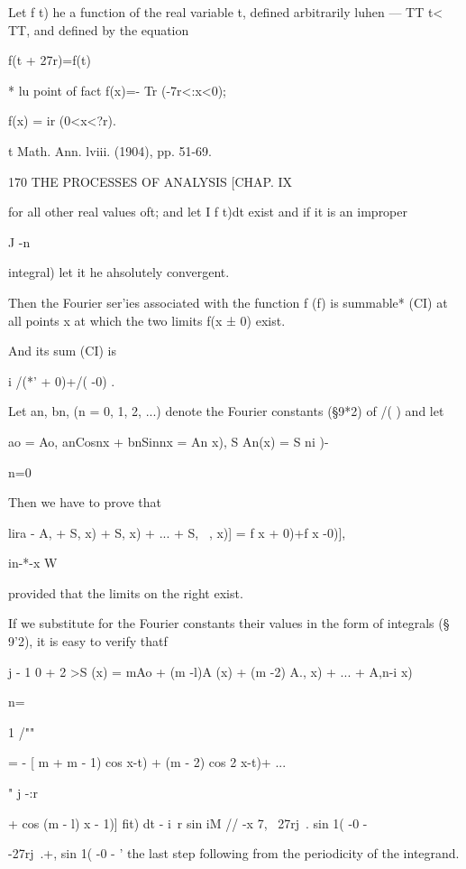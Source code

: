 Let f t) he a function of the real variable t, defined arbitrarily luhen 
— TT  t< TT, and defined by the equation 

f(t + 27r)=f(t) 

* lu point of fact f(x)=- Tr (-7r<:x<0); 

f(x) =  ir (0<x<?r). 

t Math. Ann. lviii. (1904), pp. 51-69. 



170 THE PROCESSES OF ANALYSIS [CHAP. IX 



for all other real values oft; and let I f t)dt exist and  if it is an improper 

J -n 

integral) let it he ahsolutely convergent. 

Then the Fourier ser'ies associated with the function f (f) is summable* (CI) 
at all points x at which the two limits f(x ± 0) exist. 

And its sum (CI) is 

i /(*' + 0)+/( -0) . 

Let an, bn, (n = 0, 1, 2, ...) denote the Fourier constants (§9*2) of /( ) 
and let 

 ao = Ao, anCosnx + bnSinnx = An x), S An(x) = S ni )- 



n=0 



Then we have to prove that 



lira -  A, + S, x) + S, x) + ... + S, \ , x)] =    f x + 0)+f x -0)], 

in-*-x  W 

provided that the limits on the right exist. 

If we substitute for the Fourier constants their values in the form of 
integrals (§ 9'2), it is easy to verify thatf 

j  - 1 
 0 + 2 >S  (x) = mAo + (m -l)A (x) + (m -2) A., x) + ... + A,n-i  x) 

n=\ 

1 /"" 

= - [ m +  m - 1) cos  x-t) + (m - 2) cos 2 x-t)+ ... 

 "  j -:r 

+ cos (m - l) x - 1)] fit) dt 
- i\  r sin iM  // -x 7, 
~27rj\ . sin  1( -0 -  

-27rj\ .+, sin  1( -0 -   ' 
the last step following from the periodicity of the integrand. 

